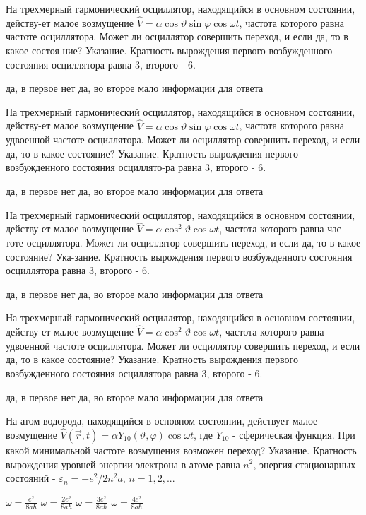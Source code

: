 \documentclass[11pt,a4paper]{exam}
\begin{document}
\begin{questions}
\question На трехмерный гармонический осциллятор, находящийся в основном состоянии, действу-ет малое возмущение $\hat V = \alpha \cos \vartheta \sin \varphi \cos \omega t$, частота которого равна частоте осциллятора. Может ли осциллятор совершить переход, и если да, то в какое состоя-ние? Указание. Кратность вырождения первого возбужденного состояния осциллятора равна 3, второго - 6.
\begin{choices}
\choice да, в первое   
\choice нет      
\choice да, во второе  
\choice мало информации для ответа
\end{choices}

\question На трехмерный гармонический осциллятор, находящийся в основном состоянии, действу-ет малое возмущение $\hat V = \alpha \cos \vartheta \sin \varphi \cos \omega t$, частота которого равна удвоенной частоте осциллятора. Может ли осциллятор совершить переход, и если да, то в какое состояние? Указание. Кратность вырождения первого возбужденного состояния осциллято-ра равна 3, второго - 6.
\begin{choices}
\choice да, в первое   
\choice нет      
\choice да, во второе  
\choice мало информации для ответа
\end{choices}

\question На трехмерный гармонический осциллятор, находящийся в основном состоянии, действу-ет малое возмущение $\hat V = \alpha {\cos ^2}\vartheta \cos \omega t$, частота которого равна час-тоте осциллятора. Может ли осциллятор совершить переход, и если да, то в какое состояние? Ука-зание. Кратность вырождения первого возбужденного состояния осциллятора равна 3, второго - 6.
\begin{choices}
\choice да, в первое   
\choice нет      
\choice да, во второе  
\choice мало информации для ответа
\end{choices}

\question На трехмерный гармонический осциллятор, находящийся в основном состоянии, действу-ет малое возмущение $\hat V = \alpha {\cos ^2}\vartheta \cos \omega t$, частота которого равна удвоенной частоте осциллятора. Может ли осциллятор совершить переход, и если да, то в какое состояние? Указание. Кратность вырождения первого возбужденного состояния осциллятора равна 3, второго - 6.
\begin{choices}
\choice да, в первое   
\choice нет      
\choice да, во второе  
\choice мало информации для ответа
\end{choices}

\question На атом водорода, находящийся в основном состоянии, действует малое возмущение $\hat V(\vec r,t) = \alpha {Y_{10}}(\vartheta ,\varphi )\cos \omega t$, где ${Y_{10}}$ - сферическая функция. При какой минимальной частоте возмущения возможен переход? Указание. Кратность вырождения уровней энергии электрона в атоме равна ${n^2}$, энергия стационарных состояний - ${\varepsilon _n} =  - {e^2}/2{n^2}a$, $n = 1,2,...$
\begin{choices}
\choice $\omega  = \frac{{{e^2}}}{{8a\hbar }}$    
\choice $\omega  = \frac{{2{e^2}}}{{8a\hbar }}$      
\choice $\omega  = \frac{{3{e^2}}}{{8a\hbar }}$      
\choice $\omega  = \frac{{4{e^2}}}{{8a\hbar }}$
\end{choices}


\end{questions}
\end{document}
